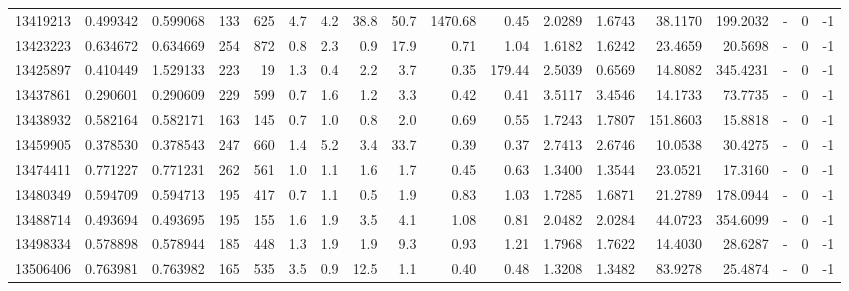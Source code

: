 \begin{tabular}{rrrrrrrrrrrrrrrlrr}
  13419213 & 0.499342 &   0.599068 &  133 &  625 &      4.7 &      4.2 &    38.8 &     50.7 &    1470.68 &        0.45 &  2.0289 &  1.6743 &   38.1170 &  199.2032 &             - &        0 &         -1 \\
  13423223 & 0.634672 &   0.634669 &  254 &  872 &      0.8 &      2.3 &     0.9 &     17.9 &       0.71 &        1.04 &  1.6182 &  1.6242 &   23.4659 &   20.5698 &             - &        0 &         -1 \\
  13425897 & 0.410449 &   1.529133 &  223 &   19 &      1.3 &      0.4 &     2.2 &      3.7 &       0.35 &      179.44 &  2.5039 &  0.6569 &   14.8082 &  345.4231 &             - &        0 &         -1 \\
  13437861 & 0.290601 &   0.290609 &  229 &  599 &      0.7 &      1.6 &     1.2 &      3.3 &       0.42 &        0.41 &  3.5117 &  3.4546 &   14.1733 &   73.7735 &             - &        0 &         -1 \\
  13438932 & 0.582164 &   0.582171 &  163 &  145 &      0.7 &      1.0 &     0.8 &      2.0 &       0.69 &        0.55 &  1.7243 &  1.7807 &  151.8603 &   15.8818 &             - &        0 &         -1 \\
  13459905 & 0.378530 &   0.378543 &  247 &  660 &      1.4 &      5.2 &     3.4 &     33.7 &       0.39 &        0.37 &  2.7413 &  2.6746 &   10.0538 &   30.4275 &             - &        0 &         -1 \\
  13474411 & 0.771227 &   0.771231 &  262 &  561 &      1.0 &      1.1 &     1.6 &      1.7 &       0.45 &        0.63 &  1.3400 &  1.3544 &   23.0521 &   17.3160 &             - &        0 &         -1 \\
  13480349 & 0.594709 &   0.594713 &  195 &  417 &      0.7 &      1.1 &     0.5 &      1.9 &       0.83 &        1.03 &  1.7285 &  1.6871 &   21.2789 &  178.0944 &             - &        0 &         -1 \\
  13488714 & 0.493694 &   0.493695 &  195 &  155 &      1.6 &      1.9 &     3.5 &      4.1 &       1.08 &        0.81 &  2.0482 &  2.0284 &   44.0723 &  354.6099 &             - &        0 &         -1 \\
  13498334 & 0.578898 &   0.578944 &  185 &  448 &      1.3 &      1.9 &     1.9 &      9.3 &       0.93 &        1.21 &  1.7968 &  1.7622 &   14.4030 &   28.6287 &             - &        0 &         -1 \\
  13506406 & 0.763981 &   0.763982 &  165 &  535 &      3.5 &      0.9 &    12.5 &      1.1 &       0.40 &        0.48 &  1.3208 &  1.3482 &   83.9278 &   25.4874 &             - &        0 &         -1 \\

\end{tabular}

